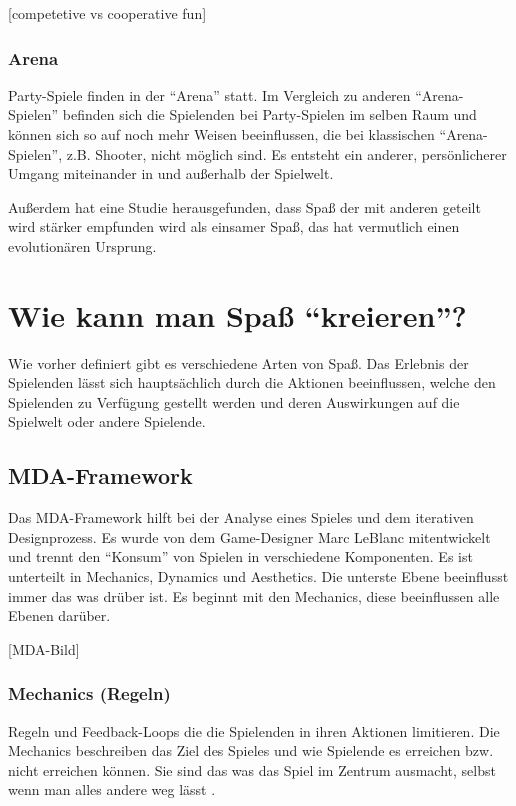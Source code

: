 [competetive vs cooperative fun]

\subsubsection{Arena}
Party-Spiele finden in der "`Arena"' statt\cite[S. 65]{_art_of_gamedesign}. Im Vergleich zu anderen "`Arena-Spielen"' befinden sich die Spielenden bei Party-Spielen im selben Raum und können sich so auf noch mehr Weisen beeinflussen, die bei klassischen "`Arena-Spielen"', z.B. Shooter, nicht möglich sind. Es entsteht ein anderer, persönlicherer Umgang miteinander in und außerhalb der Spielwelt.\newline

\noindent Außerdem hat eine Studie herausgefunden, dass Spaß der mit anderen geteilt wird stärker empfunden wird als einsamer Spaß, das hat vermutlich einen evolutionären Ursprung\cite{_fun_is_more_fun}.

\section{Wie kann man Spaß "`kreieren"'?}

Wie vorher definiert gibt es verschiedene Arten von Spaß. Das Erlebnis der Spielenden lässt sich hauptsächlich durch die Aktionen beeinflussen, welche den Spielenden zu Verfügung gestellt werden und deren Auswirkungen auf die Spielwelt oder andere Spielende.

\subsection{MDA-Framework}

Das MDA-Framework hilft bei der Analyse eines Spieles und dem iterativen Designprozess. Es wurde von dem Game-Designer Marc LeBlanc mitentwickelt und trennt den "`Konsum"' von Spielen in verschiedene Komponenten\cite{_mda}. Es ist unterteilt in Mechanics, Dynamics und Aesthetics. Die unterste Ebene beeinflusst immer das was drüber ist. Es beginnt mit den Mechanics, diese beeinflussen alle Ebenen darüber.

[MDA-Bild]

\subsubsection{Mechanics (Regeln)}

Regeln und Feedback-Loops die die Spielenden in ihren Aktionen limitieren. Die Mechanics beschreiben das Ziel des Spieles und wie Spielende es erreichen bzw. nicht erreichen können\cite[S.96]{_art_of_gamedesign}. Sie sind das was das Spiel im Zentrum ausmacht, selbst wenn man alles andere weg lässt \cite[S.231]{_art_of_gamedesign}.
 
